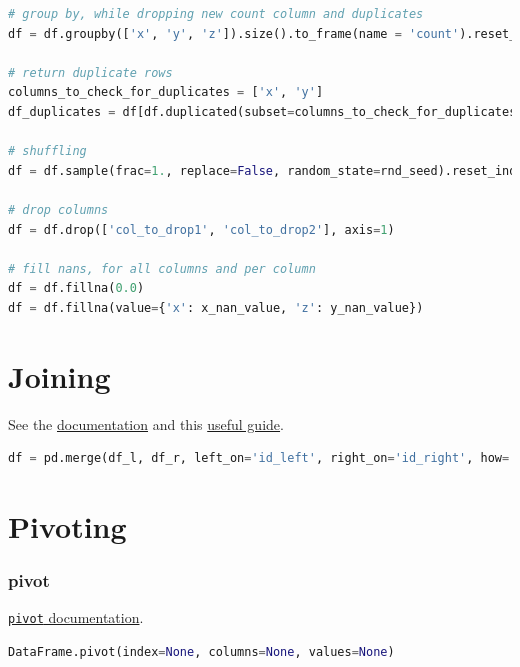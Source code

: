 \begin{lstlisting}[language=Python]
# group by, while dropping new count column and duplicates
df = df.groupby(['x', 'y', 'z']).size().to_frame(name = 'count').reset_index().drop(['count'], axis=1).drop_duplicates()

# return duplicate rows
columns_to_check_for_duplicates = ['x', 'y']
df_duplicates = df[df.duplicated(subset=columns_to_check_for_duplicates, keep=False)]

# shuffling
df = df.sample(frac=1., replace=False, random_state=rnd_seed).reset_index(drop=True)

# drop columns
df = df.drop(['col_to_drop1', 'col_to_drop2'], axis=1)

# fill nans, for all columns and per column 
df = df.fillna(0.0)
df = df.fillna(value={'x': x_nan_value, 'z': y_nan_value})
\end{lstlisting}

\clearpage

\section{Joining}
\label{pandas:join}

\noindent See the \href{https://pandas.pydata.org/pandas-docs/stable/user_guide/merging.html}{documentation} and this \href{http://chrisalbon.com/python/data_wrangling/pandas_join_merge_dataframe/}{useful guide}.

\begin{lstlisting}[language=Python]
df = pd.merge(df_l, df_r, left_on='id_left', right_on='id_right', how='left')
\end{lstlisting}

\section{Pivoting}
\label{pandas:pivoting}

\subsubsection{pivot}
\label{pandas:pivoting:pivot}

\noindent \href{http://pandas.pydata.org/pandas-docs/stable/reference/api/pandas.DataFrame.pivot.html}{\texttt{pivot} documentation}.

\begin{lstlisting}[language=Python]
DataFrame.pivot(index=None, columns=None, values=None)
\end{lstlisting}

